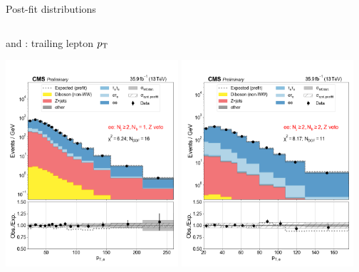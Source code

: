 \begin{frame}{} %
Post-fit distributions

    \begin{columns}
        \begin{tcolorbox}[colframe=NUpurple]{ \cee and \cmm: trailing lepton $p_{\mathrm{T}}$}
            \begin{center}
                \includegraphics[width=0.48\textwidth]{chapters/Analysis/sectionStatisticalAnalysis/figures/fit/ee_cat_gt2_eq1_b}
                \includegraphics[width=0.48\textwidth]{chapters/Analysis/sectionStatisticalAnalysis/figures/fit/ee_cat_gt2_gt2_b}


\end{center}
\end{tcolorbox}
\end{columns}
\end{frame}
